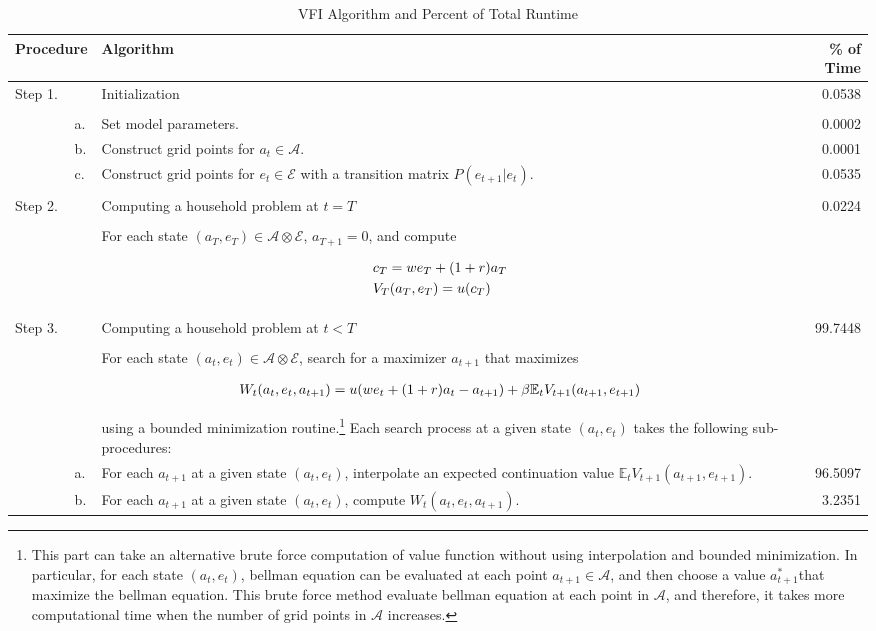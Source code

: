 \documentclass[12pt]{article}
\begin{document}
\begin{table}
\caption{VFI Algorithm and Percent of Total Runtime}
\smallskip
\small
\begin{tabular}{p{1.3cm}p{0.1cm}p{11.5cm}r}
\multicolumn{2}{l}{\textbf{Procedure}}& \textbf{Algorithm} & \textbf{\% of Time}\\
\hline
Step 1. &&Initialization & 0.0538\\
\hline
\\[-0.7em]
		&a.&  Set model parameters. & 0.0002\\
		&b.&  Construct grid points for $a_{t} \in \mathcal{A}$. & 0.0001\\
		&c.&  Construct grid points for $e_t \in \mathcal{E}$ with a transition matrix $P(e_{t+1}|e_t)$.&0.0535\\
\\[-0.8em]\hline
Step 2. &&Computing a household problem at $t=T$ & 0.0224\\
\hline
\\[-0.7em]
		&&  For each state $(a_T, e_T)\in \mathcal{A} \otimes \mathcal{E}$, $a_{T+1}=0$, and compute\\
[-0.9em]
&&\parbox{4cm}{
\begin{align}
&c_T = w e_T + (1+r) a_T \notag\\
&V_{T}(a_T,e_T) = u(c_T)\notag
\end{align}}\\
\\[-1.7em]\hline
Step 3. && Computing a household problem at $t<T$ & 99.7448\\
\hline
\\[-0.7em]
		&&  For each state $(a_{t},e_{t})\in \mathcal{A} \otimes \mathcal{E}$, search for a maximizer $a_{t+1}$ that maximizes\\
[-0.9em]
&&\parbox{4cm}{
\begin{align}
W_t(a_{t},e_t,a_{t+1}) = u(w e_t + (1+r)a_t - a_{t+1}) + \beta \mathbb{E}_t V_{t+1}(a_{t+1},e_{t+1}) \notag
\end{align}} \\
[-0.5em]
&& using a bounded minimization routine.\footnote{This part can take an alternative brute force computation of value function without using interpolation and bounded minimization. In particular, for each state $(a_t,e_t)$, bellman equation can be evaluated at each point $a_{t+1}\in\mathcal{A}$, and then choose a value $a^*_{t+1}$that maximize the bellman equation. This brute force method evaluate bellman equation at each point in $\mathcal{A}$, and therefore, it takes more computational time when the number of grid points in $\mathcal{A}$ increases.} Each search process at a given state $(a_{t},e_{t})$ takes the following sub-procedures:\\
		&a.& For each $a_{t+1}$ at a given state $(a_t,e_t)$, interpolate an expected continuation value $\mathbb{E}_t V_{t+1}(a_{t+1},e_{t+1})$. & 96.5097\\
		&b.& For each $a_{t+1}$ at a given state $(a_t,e_t)$, compute $W_t(a_{t},e_t,a_{t+1})$. &3.2351\\
\hline
\end{tabular}
\end{table}
\end{document}
